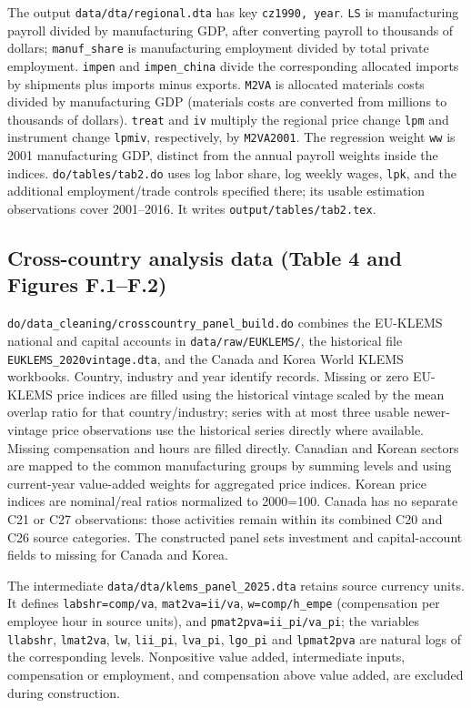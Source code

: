 \documentclass[11pt]{article}
\newcommand{\pkgfile}[1]{\nolinkurl{#1}}
\begin{document}
The output \pkgfile{data/dta/regional.dta} has key
\texttt{cz1990, year}. \texttt{LS} is manufacturing payroll divided by
manufacturing GDP, after converting payroll to thousands of dollars;
\texttt{manuf\_share} is manufacturing employment divided by total
private employment. \texttt{impen} and \texttt{impen\_china} divide the corresponding
allocated imports by shipments plus imports minus exports.
\texttt{M2VA} is allocated materials costs divided by manufacturing GDP
(materials costs are converted from millions to thousands of dollars).
\texttt{treat} and \texttt{iv} multiply the regional price change
\texttt{lpm} and instrument change \texttt{lpmiv}, respectively, by
\texttt{M2VA2001}. The regression weight \texttt{ww} is 2001 manufacturing
GDP, distinct from the annual payroll weights inside the indices.
\pkgfile{do/tables/tab2.do} uses log labor share, log weekly wages,
\texttt{lpk}, and the additional employment/trade controls specified there;
its usable estimation observations cover 2001--2016. It writes
\pkgfile{output/tables/tab2.tex}.

\subsection{Cross-country analysis data (Table 4 and Figures F.1--F.2)}

\pkgfile{do/data_cleaning/crosscountry_panel_build.do} combines the
EU-KLEMS national and capital accounts in \pkgfile{data/raw/EUKLEMS/},
the historical file \pkgfile{EUKLEMS_2020vintage.dta}, and the Canada and
Korea World KLEMS workbooks. Country, industry and year identify records.
Missing or zero EU-KLEMS price indices are filled using the historical
vintage scaled by the mean overlap ratio for that country/industry;
series with at most three usable newer-vintage price observations use
the historical series directly where available. Missing compensation and
hours are filled directly. Canadian and Korean sectors are mapped to
the common manufacturing groups by summing levels and using current-year
value-added weights for aggregated price indices. Korean price indices
are nominal/real ratios normalized to 2000=100. Canada has no separate
C21 or C27 observations: those activities remain within its combined C20
and C26 source categories. The constructed panel sets investment and capital-account fields
to missing for Canada and Korea.

The intermediate \pkgfile{data/dta/klems_panel_2025.dta} retains source
currency units. It defines \texttt{labshr=comp/va},
\texttt{mat2va=ii/va}, \texttt{w=comp/h\_empe} (compensation per employee
hour in source units), and \texttt{pmat2pva=ii\_pi/va\_pi}; the variables \texttt{llabshr}, \texttt{lmat2va}, \texttt{lw},
\texttt{lii\_pi}, \texttt{lva\_pi}, \texttt{lgo\_pi} and
\texttt{lpmat2pva} are natural logs of the corresponding levels. Nonpositive value added,
intermediate inputs, compensation or employment, and compensation above
value added, are excluded during construction.
\end{document}
